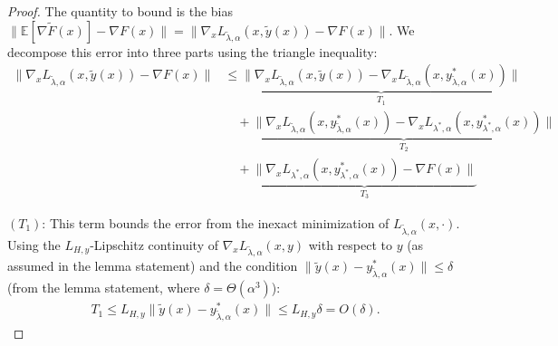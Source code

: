 \documentclass[letterpaper]{article} %
\newcommand{\1}{\mathbf{1}}
\begin{document}
\hypergradapprox*
\begin{proof}
The quantity to bound is the bias $\| \mathbb{E}[\nabla\tilde{F}(x)] - \nabla F(x) \| = \| \nabla_x L_{\tilde{\lambda},\alpha}(x, \tilde{y}(x)) - \nabla F(x) \|$. We decompose this error into three parts using the triangle inequality:
\begin{align}
\| \nabla_x L_{\tilde{\lambda},\alpha}(x, \tilde{y}(x)) - \nabla F(x) \| 
&\leq \underbrace{\|\nabla_x L_{\tilde{\lambda},\alpha}(x, \tilde{y}(x)) - \nabla_x L_{\tilde{\lambda},\alpha}(x, y^*_{\tilde{\lambda},\alpha}(x))\|}_{T_1} \\
&\quad + \underbrace{\|\nabla_x L_{\tilde{\lambda},\alpha}(x, y^*_{\tilde{\lambda},\alpha}(x)) - \nabla_x L_{\lambda^*,\alpha}(x, y^*_{\lambda^*,\alpha}(x))\|}_{T_2} \\
&\quad + \underbrace{\|\nabla_x L_{\lambda^*,\alpha}(x, y^*_{\lambda^*,\alpha}(x)) - \nabla F(x)\|}_{T_3}
\end{align}

$(T_1)$: This term bounds the error from the inexact minimization of $L_{\tilde{\lambda},\alpha}(x,\cdot)$. Using the $L_{H,y}$-Lipschitz continuity of $\nabla_x L_{\tilde{\lambda},\alpha}(x,y)$ with respect to $y$ (as assumed in the lemma statement) and the condition $\|\tilde{y}(x) - y^*_{\tilde{\lambda},\alpha}(x)\| \leq \delta$ (from the lemma statement, where $\delta = \Theta(\alpha^3)$):
\begin{align}
T_1 \leq L_{H,y} \|\tilde{y}(x) - y^*_{\tilde{\lambda},\alpha}(x)\| \leq L_{H,y} \delta = O(\delta).
\end{align}


\end{proof}
\end{document}
